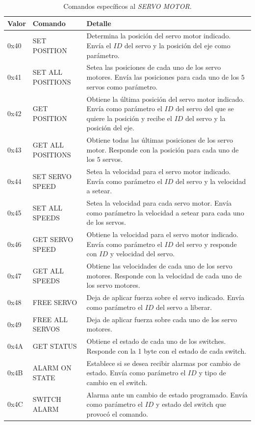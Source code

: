 \begin{table}
	\begin{center}
		\begin{tabular}{|l|p{2.5cm}|p{7.5cm}|}
		\hline
		Valor & Comando & Detalle \\
		\hline
		0x40 & SET POSITION & Determina la posici\'on del servo motor indicado.
		Env\'ia el $ID$ del servo y la posici\'on del eje como par\'ametro. \\
		\hline
		0x41 & SET ALL POSITIONS & Setea las posiciones de cada uno de los servo motores.
		Env\'ia las posiciones para cada uno de los $5$ servos como par\'ametro.\\
		\hline
		0x42 & GET POSITION & Obtiene la \'ultima posici\'on del servo motor indicado.
		Env\'ia como par\'ametro el $ID$ del servo del que se quiere la posici\'on y
		recibe el $ID$ del servo y la posici\'on del eje. \\
		\hline
		0x43 & GET ALL POSITIONS & Obtiene todas las \'ultimas posiciones de los servo motor.
		Responde con la posici\'on para cada uno de los $5$ servos.\\
		\hline
		0x44 & SET SERVO SPEED & Setea la velocidad para el servo motor indicado.
		Env\'ia como par\'ametro el $ID$ del servo y la velocidad a setear. \\
		\hline
		0x45 & SET ALL SPEEDS & Setea la velocidad para cada servo motor.
		Env\'ia como par\'ametro la velocidad a setear para cada uno de los servos. \\
		\hline
		0x46 & GET SERVO SPEED & Obtiene la velocidad para el servo motor indicado.
		Env\'ia como par\'ametro el $ID$ del servo y responde con $ID$ y velocidad del servo. \\
		\hline
		0x47 & GET ALL SPEEDS & Obtiene las velocidades de cada uno de los servo motores.
		Responde con la velocidad de cada uno de los servo motores. \\
		\hline
		0x48 & FREE SERVO & Deja de aplicar fuerza sobre el servo indicado.
		Env\'ia como par\'ametro el $ID$ del servo a liberar.\\
		\hline
		0x49 & FREE ALL SERVOS & Deja de aplicar fuerza sobre cada uno de los servo motores. \\
		\hline
		0x4A & GET STATUS & Obtiene el estado de cada uno de los switches.
		Responde con la 1 byte con el estado de cada switch. \\
		\hline
		0x4B & ALARM ON STATE & Establece si se desea recibir alarmas por cambio de estado.
		Env\'ia como par\'ametro el $ID$ y tipo de cambio en el switch.\\
		\hline
		0x4C & SWITCH ALARM & Alarma ante un cambio de estado programado.
		Env\'ia como par\'ametro el $ID$ y estado del switch que provoc\'o el comando. \\
		\hline
		\end{tabular}
		\caption{Comandos espec\'ificos al \emph{SERVO MOTOR}. }
		\label{hT_comm_comandos_servo}
	\end{center}
\end{table}

